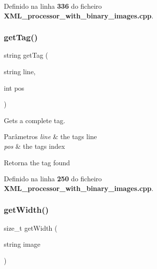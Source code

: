 Definido na linha \textbf{ 336} do ficheiro \textbf{ X\+M\+L\+\_\+processor\+\_\+with\+\_\+binary\+\_\+images.\+cpp}.

\mbox{\label{_x_m_l__processor__with__binary__images_8cpp_a891425af8c2c62f13a4c0e9a0eae4e05}} 
\subsubsection{get\+Tag()}
{\footnotesize\ttfamily string get\+Tag (\begin{DoxyParamCaption}\item[{string}]{line,  }\item[{int}]{pos }\end{DoxyParamCaption})}



Gets a complete tag. 


\begin{DoxyParams}{Parâmetros}
{\em line} & the tag\textquotesingle{}s line \\
\hline
{\em pos} & the tag\textquotesingle{}s index \\
\hline
\end{DoxyParams}
\begin{DoxyReturn}{Retorna}
the tag found 
\end{DoxyReturn}


Definido na linha \textbf{ 250} do ficheiro \textbf{ X\+M\+L\+\_\+processor\+\_\+with\+\_\+binary\+\_\+images.\+cpp}.

\mbox{\label{_x_m_l__processor__with__binary__images_8cpp_a0822dbda520f18cfe7358bc35e24a798}} 
\subsubsection{get\+Width()}
{\footnotesize\ttfamily size\+\_\+t get\+Width (\begin{DoxyParamCaption}\item[{string}]{image }\end{DoxyParamCaption})}



